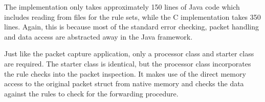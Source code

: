 \documentclass[final_report.tex]{subfiles}
\begin{document}
The implementation only takes approximately 150 lines of Java code which includes reading from files for the rule sets, while the C implementation takes 350 lines. Again, this is because most of the standard error checking, packet handling and data access are abstracted away in the Java framework.

Just like the packet capture application, only a processor class and starter class are required. The starter class is identical, but the processor class incorporates the rule checks into the packet inspection. It makes use of the direct memory access to the original packet struct from native memory and checks the data against the rules to check for the forwarding procedure.
\end{document}
